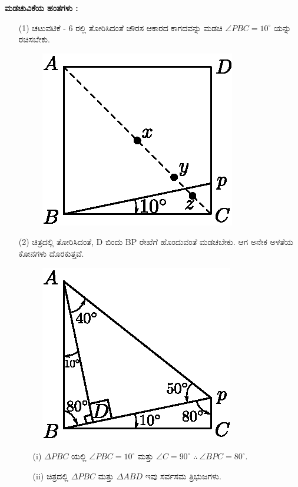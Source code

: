 \noindent
\textbf{ಮಡಚುವಿಕೆಯ ಹಂತಗಳು :}
\begin{enumerate}
\item[(1)] ಚಟುವಟಿಕೆ - 6 ರಲ್ಲಿ ತೋರಿಸಿದಂತೆ ಚೌರಸ ಆಕಾರದ ಕಾಗದವನ್ನು ಮಡಚಿ $\angle PBC = 10^\circ$ ಯನ್ನು ರಚಿಸಬೇಕು.
\begin{figure}[H]
\centering
\includegraphics[scale=.87]{src/figure/chap1/fig1-13a.eps}
\end{figure}

\item[(2)] ಚಿತ್ರದಲ್ಲಿ ತೋರಿಸಿದಂತೆ, D ಬಿಂದು BP ರೇಖೆಗೆ ಹೊಂದುವಂತೆ ಮಡಚಬೇಕು. ಆಗ ಅನೇಕ ಅಳತೆಯ ಕೋನಗಳು ದೊರಕುತ್ತವೆ. 
\begin{figure}[H]
\centering
\includegraphics[scale=.87]{src/figure/chap1/fig1-13b.eps}
\end{figure}
\begin{itemize}
\item[(i)] $\Delta PBC$ ಯಲ್ಲಿ $\angle PBC =  10^\circ$ ಮತ್ತು $\angle C =90^\circ$  $\therefore ~ \angle BPC = 80^\circ$.

\item[(ii)] ಚಿತ್ರದಲ್ಲಿ $\Delta PBC$ ಮತ್ತು $\Delta ABD$ ಇವು ಸರ್ವಸಮ ತ್ರಿಭುಜಗಳು.


\end{itemize}
\end{enumerate}
